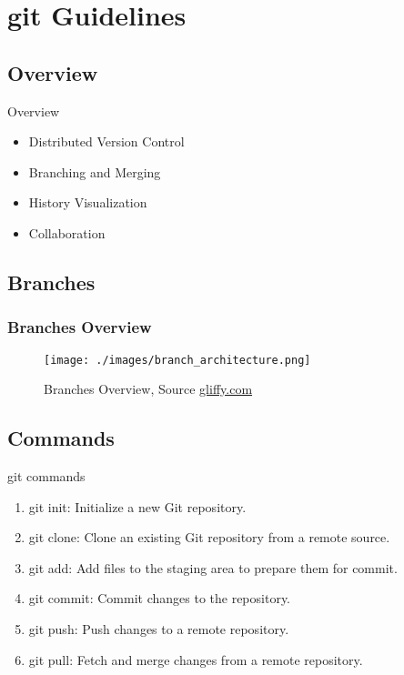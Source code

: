 \section{git Guidelines}
\subsection{Overview}
\begin{frame}
    \begin{content}{Overview}
        \begin{itemize}
            \item Distributed Version Control
            \item Branching and Merging
            \item History Visualization
            \item Collaboration
        \end{itemize}
    \end{content}
\end{frame}
\subsection*{Branches}
\begin{frame}
    \frametitle{Branches Overview}
    \begin{figure}    
        \texttt{[image: ./images/branch\_architecture.png]}
        \caption{Branches Overview, Source \href{https://www.gliffy.com/blog/gitflow-diagrams}{gliffy.com}} 
    \end{figure}
\end{frame}
\subsection{Commands}
\begin{frame}
    \begin{content}{git commands}
        \begin{enumerate}
            \item git init: Initialize a new Git repository.
            \item git clone: Clone an existing Git repository from a remote source.
            \item git add: Add files to the staging area to prepare them for commit.
            \item git commit: Commit changes to the repository.
            \item git push: Push changes to a remote repository.
            \item git pull: Fetch and merge changes from a remote repository.
        \end{enumerate}
    \end{content}
\end{frame}

